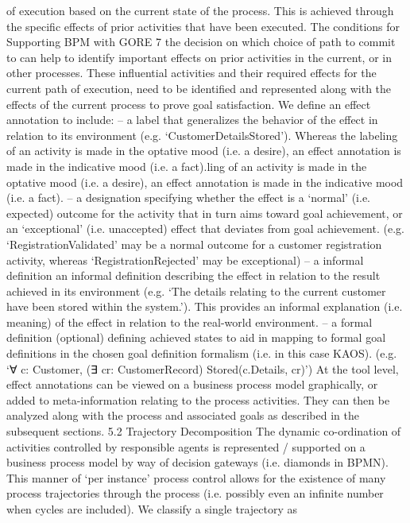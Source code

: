 of execution based on the current state of the process. This is achieved through
the specific effects of prior activities that have been executed. The conditions for
Supporting BPM with GORE 7
the decision on which choice of path to commit to can help to identify important
effects on prior activities in the current, or in other processes. These influential
activities and their required effects for the current path of execution, need to be
identified and represented along with the effects of the current process to prove
goal satisfaction.
We define an effect annotation to include:
– a label that generalizes the behavior of the effect in relation to its environment (e.g. ‘CustomerDetailsStored’). Whereas the labeling of an activity is
made in the optative mood (i.e. a desire), an effect annotation is made in
the indicative mood (i.e. a fact).ling of an activity is made in the optative
mood (i.e. a desire), an effect annotation is made in the indicative mood (i.e.
a fact).
– a designation specifying whether the effect is a ‘normal’ (i.e. expected) outcome for the activity that in turn aims toward goal achievement, or an ‘exceptional’ (i.e. unaccepted) effect that deviates from goal achievement. (e.g.
‘RegistrationValidated’ may be a normal outcome for a customer registration
activity, whereas ‘RegistrationRejected’ may be exceptional)
– a informal definition an informal definition describing the effect in relation
to the result achieved in its environment (e.g. ‘The details relating to the
current customer have been stored within the system.’). This provides an
informal explanation (i.e. meaning) of the effect in relation to the real-world
environment.
– a formal definition (optional) defining achieved states to aid in mapping to
formal goal definitions in the chosen goal definition formalism (i.e. in this
case KAOS). (e.g. ‘∀ c: Customer, (∃ cr: CustomerRecord) Stored(c.Details,
cr)’)
At the tool level, effect annotations can be viewed on a business process model
graphically, or added to meta-information relating to the process activities. They
can then be analyzed along with the process and associated goals as described
in the subsequent sections.
5.2 Trajectory Decomposition
The dynamic co-ordination of activities controlled by responsible agents is represented / supported on a business process model by way of decision gateways (i.e.
diamonds in BPMN). This manner of ‘per instance’ process control allows for
the existence of many process trajectories through the process (i.e. possibly even
an infinite number when cycles are included). We classify a single trajectory as
